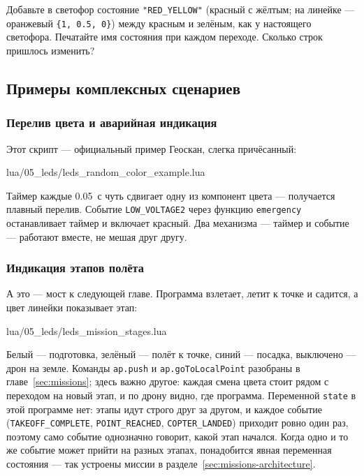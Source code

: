 \begin{taskbox}
Добавьте в светофор состояние \verb|"RED_YELLOW"| (красный с жёлтым; на линейке --- оранжевый \verb|{1, 0.5, 0}|) между красным и зелёным, как у настоящего светофора. Печатайте имя состояния при каждом переходе. Сколько строк пришлось изменить?
\end{taskbox}

\subsection{Примеры комплексных сценариев}

\subsubsection*{Перелив цвета и аварийная индикация}

Этот скрипт --- официальный пример Геоскан, слегка причёсанный:

\begin{codefile}{lua/05_leds/leds_random_color_example.lua}
\end{codefile}

Таймер каждые 0.05~с чуть сдвигает одну из компонент цвета --- получается плавный перелив. Событие \verb|LOW_VOLTAGE2| через функцию \verb|emergency| останавливает таймер и включает красный. Два механизма --- таймер и событие --- работают вместе, не мешая друг другу.

\subsubsection*{Индикация этапов полёта}

А это --- мост к следующей главе. Программа взлетает, летит к точке и садится, а цвет линейки показывает этап:

\begin{codefile}{lua/05_leds/leds_mission_stages.lua}
\end{codefile}

Белый --- подготовка, зелёный --- полёт к точке, синий --- посадка, выключено --- дрон на земле. Команды \verb|ap.push| и \verb|ap.goToLocalPoint| разобраны в главе~\ref{sec:missions}; здесь важно другое: каждая смена цвета стоит рядом с переходом на новый этап, и по дрону видно, где программа. Переменной \verb|state| в этой программе нет: этапы идут строго друг за другом, и каждое событие (\verb|TAKEOFF_COMPLETE|, \verb|POINT_REACHED|, \verb|COPTER_LANDED|) приходит ровно один раз, поэтому само событие однозначно говорит, какой этап начался. Когда одно и то же событие может прийти на разных этапах, понадобится явная переменная состояния --- так устроены миссии в разделе~\ref{sec:missions-architecture}.

